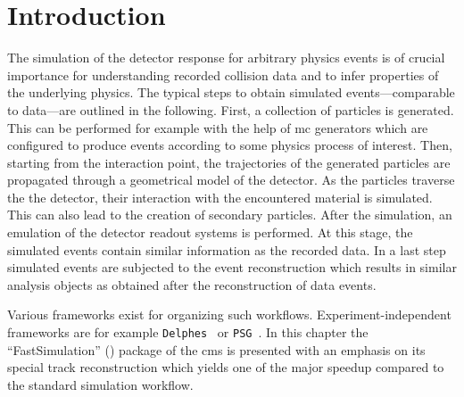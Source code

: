 


\section{Introduction}

The simulation of the detector response for arbitrary physics events is of crucial importance for understanding recorded collision data and to infer properties of the underlying physics. The typical steps to obtain simulated events---comparable to data---are outlined in the following. First, a collection of particles is generated. This can be performed for example with the help of \acrfull{mc} generators which are configured to produce events according to some physics process of interest. Then, starting from the interaction point, the trajectories of the generated particles are propagated through a geometrical model of the detector. As the particles traverse the the detector, their interaction with the encountered material is simulated. This can also lead to the creation of secondary particles. After the simulation, an emulation of the detector readout systems is performed. At this stage, the simulated events contain similar information as the recorded data. In a last step simulated events are subjected to the event reconstruction which results in similar analysis objects as obtained after the reconstruction of data events. 

Various frameworks exist for organizing such workflows. Experiment-independent frameworks are for example \texttt{Delphes}~\cite{deFavereau:2013fsa} or \texttt{PSG}~\cite{psg}. In this chapter the ``FastSimulation'' (\FSIM[format=hyperbf]) package of the \gls{cms} is presented with an emphasis on its special track reconstruction which yields one of the major speedup compared to the standard simulation workflow.

